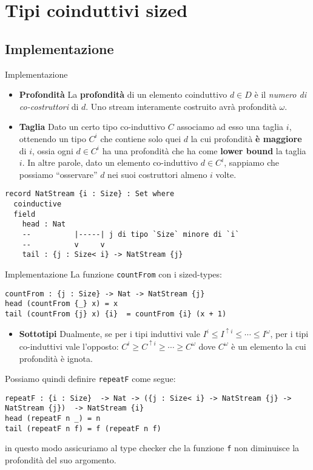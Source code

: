 \documentclass[t,aspectratio=169,10pt]{beamer}
\begin{document}
\section[coinduttivi sized]{Tipi coinduttivi sized}
\subsection{Implementazione}
\begin{frame}[fragile]{Implementazione}
	\begin{itemize}
		\item{{\bf Profondità}
		            La \textbf{profondità} di un elemento coinduttivo $d \in D$ è il
		            \textit{numero di co-costruttori} di $d$. Uno stream interamente
		            costruito avrà profondità $\omega$.
		      }
		\item{{\bf Taglia}
		Dato un certo tipo co-induttivo $C$ associamo ad esso una taglia $i$,
		ottenendo un tipo $C^i$ che contiene solo quei $d$ la cui profondità {\bf
		è maggiore} di $i$, ossia ogni $d \in C^i$ ha una profondità che ha come
			{\bf lower bound} la taglia $i$. In altre parole, dato un elemento
		co-induttivo $d \in C^{i}$, sappiamo che possiamo ``osservare'' $d$ nei
		suoi costruttori almeno $i$ volte.
		}
	\end{itemize}

	\begin{verbatim}
record NatStream {i : Size} : Set where 
  coinductive
  field 
    head : Nat 
    --          |-----| j di tipo `Size` minore di `i`
    --          v     v
    tail : {j : Size< i} -> NatStream {j}
  \end{verbatim}
\end{frame}
\begin{frame}[fragile]{Implementazione}
	La funzione \texttt{countFrom} con i sized-types:
	\begin{verbatim}
countFrom : {j : Size} -> Nat -> NatStream {j}
head (countFrom {_} x) = x
tail (countFrom {j} x) {i}  = countFrom {i} (x + 1)
\end{verbatim}
	\begin{itemize}
		\item{{\bf Sottotipi}
		            Dualmente, se per i tipi induttivi vale $I^i \leq
			            I^{\uparrow i} \leq \cdots \leq I^{\omega}$, per i
		            tipi co-induttivi vale l'opposto: $C^i \geq
			            C^{\uparrow i} \geq \cdots \geq C^{\omega}$ dove
		            $C^{\omega}$ è un elemento la cui profondità è
		            ignota.
		      }
	\end{itemize}

	Possiamo quindi definire \texttt{repeatF} come segue:
	\begin{verbatim}
repeatF : {i : Size}  -> Nat -> ({j : Size< i} -> NatStream {j} -> NatStream {j})  -> NatStream {i}
head (repeatF n _) = n 
tail (repeatF n f) = f (repeatF n f)
\end{verbatim}
	in questo modo assicuriamo al type checker che la funzione \texttt{f} non
	diminuisce la profondità del suo argomento.
\end{frame}
\end{document}
